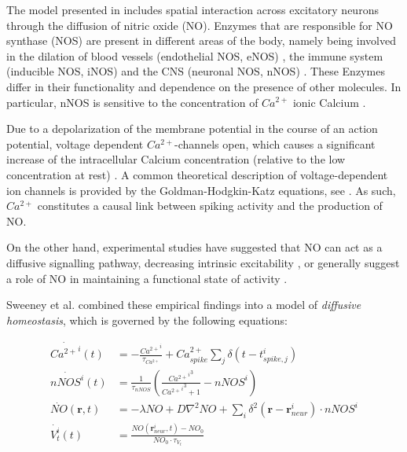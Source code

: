 \documentclass[10pt,a4paper]{article}
\begin{document}
The model presented in \cite{Sweeney_Paper} includes spatial interaction across excitatory neurons through the diffusion of nitric oxide (NO). Enzymes that are responsible for NO synthase (NOS) are present in different areas of the body, namely being involved in the dilation of blood vessels (endothelial NOS, eNOS) , the immune system (inducible NOS, iNOS) and the CNS (neuronal NOS, nNOS) \cite{NOS_Mammals}. These Enzymes differ in their functionality and dependence on the presence of other molecules. In particular, nNOS is sensitive to the concentration of $Ca^{2+}$ ionic Calcium \cite{Knowles_Ca_nNOS}.

Due to a depolarization of the membrane potential in the course of an action potential, voltage dependent $Ca^{2+}$-channels open, which causes a significant increase of the intracellular Calcium concentration (relative to the low concentration at rest) \cite[p.~98-100]{Hille_Ion_Channels}. A common theoretical description of voltage-dependent ion channels is provided by the Goldman-Hodgkin-Katz equations, see \cite[p.~445-451]{Hille_Ion_Channels}. As such, $Ca^{2+}$ constitutes a causal link between spiking activity and the production of NO.

On the other hand, experimental studies have suggested that NO can act as a diffusive signalling pathway, decreasing intrinsic excitability \cite{Steinert_NO}, or generally suggest a role of NO in maintaining a functional state of activity \cite{Pape_NO}.

Sweeney et al. combined these empirical findings into a model of \emph{diffusive homeostasis}, which is governed by the following equations:   

\begin{align}
\dot{{Ca^{2+}}^i}(t) &= -\frac{{Ca^{2+}}^i}{\tau_{Ca^{2+}}} + Ca^{2+}_{spike} \sum_{j} \delta(t-t^i_{spike,j}) \label{Ca_dyn}\\
\dot{nNOS^i}(t) &= \frac{1}{\tau_{nNOS}} \left(  \frac{{{Ca^{2+}}^i}^3}{{{Ca^{2+}}^i}^3+1} - nNOS^i \right) \label{nNOS_dyn}\\
\dot{NO}(\mathbf{r},t)&=-\lambda NO + D \nabla^2 NO + \sum_{i} \delta^2(\mathbf{r}-\mathbf{r}_{neur}^i)\cdot nNOS^i \label{NO_dyn}\\
\dot{V_t^i}(t) &= \frac{NO(\mathbf{r}_{neur}^i,t)-NO_0}{NO_0\cdot\tau_{V_t}} \label{Theta_dyn}
\end{align}
\end{document}
